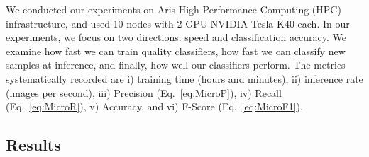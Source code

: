 \documentclass[journal]{IEEEtran}
\begin{document}
We conducted our experiments on Aris High Performance Computing (HPC) infrastructure, and used 10 nodes with 2 GPU-NVIDIA Tesla K40 each. In our experiments, we focus on two directions: speed and classification accuracy. We examine how fast we can train quality classifiers, how fast we can classify new samples at inference, and finally, how well our classifiers perform. The metrics systematically recorded are i) training time (hours and minutes), ii) inference rate (images per second), iii) Precision (Eq.~\ref{eq:MicroP}), iv) Recall (Eq.~\ref{eq:MicroR}), v) Accuracy, and vi) F-Score (Eq.~\ref{eq:MicroF1}). 




\subsection{Results}
\end{document}
